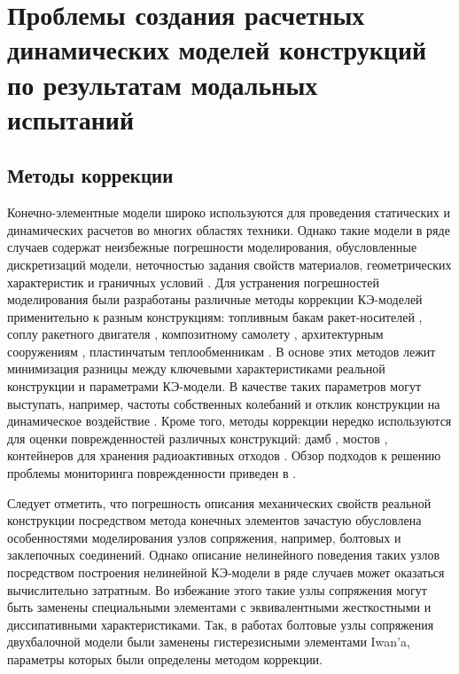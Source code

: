 \chapter{Проблемы создания расчетных динамических моделей конструкций по результатам модальных испытаний}

\section{Методы коррекции} 

Конечно-элементные модели широко используются для проведения статических и динамических расчетов во многих областях техники. Однако такие модели в ряде случаев содержат неизбежные погрешности моделирования, обусловленные дискретизаций модели, неточностью задания свойств материалов, геометрических характеристик и граничных условий \cite{lib:modelUpdating:Bartilson}. Для устранения погрешностей моделирования были разработаны различные методы коррекции КЭ-моделей применительно к разным конструкциям: топливным бакам ракет-носителей \cite{lib:modelUpdating:Li&Tian}, соплу ракетного двигателя \cite{lib:modelUpdating:Yan&Li}, композитному самолету \cite{lib:modelUpdating:Zhao&Gupta}, архитектурным сооружениям \cite{lib:modelUpdating:Girardi&Padovani}, пластинчатым теплообменникам \cite{lib:modelUpdating:Guo&Wang}. В основе этих методов лежит минимизация разницы между ключевыми характеристиками реальной конструкции и параметрами КЭ-модели. В качестве таких параметров могут выступать, например, частоты собственных колебаний и отклик конструкции на динамическое воздействие \cite{lib:modelUpdating:Petersen&Oiseth}. Кроме того, методы коррекции нередко используются для оценки поврежденностей различных конструкций: дамб \cite{lib:modelUpdating:Bayraktar&Sevim}, мостов \cite{lib:modelUpdating:Cong&Thoi, lib:modelUpdating:Polanco}, контейнеров для хранения радиоактивных отходов \cite{lib:modelUpdating:Eiras}. Обзор подходов к решению проблемы мониторинга поврежденности приведен в \cite{lib:modelUpdating:Simoen}. 

Следует отметить, что погрешность описания механических свойств реальной конструкции посредством метода конечных элементов зачастую обусловлена особенностями моделирования узлов сопряжения, например, болтовых и заклепочных соединений. Однако описание нелинейного поведения таких узлов посредством построения нелинейной КЭ-модели в ряде случаев может оказаться вычислительно затратным. Во избежание этого такие узлы сопряжения могут быть заменены специальными элементами с эквивалентными жесткостными и диссипативными характеристиками. Так, в работах \cite{lib:modelUpdating:Lacayo, lib:modelUpdating:Yuan} болтовые узлы сопряжения двухбалочной модели были заменены гистерезисными элементами Iwan’a, параметры которых были определены методом коррекции. 

